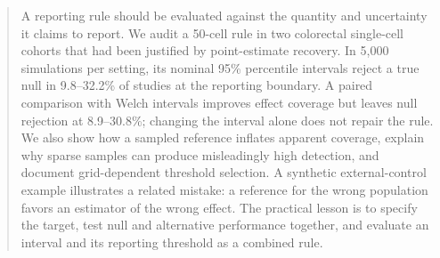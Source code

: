 \begin{abstract}
A reporting rule should be evaluated against the quantity and uncertainty it
claims to report. We audit a 50-cell rule in two colorectal single-cell cohorts
that had been justified by point-estimate recovery. In 5{,}000 simulations per
setting, its nominal 95\% percentile intervals reject a true null in
9.8--32.2\% of studies at the reporting boundary. A paired comparison with
Welch intervals improves effect coverage but leaves null rejection at
8.9--30.8\%; changing the interval alone does not repair the rule. We also
show how a sampled reference inflates apparent coverage, explain why sparse
samples can produce misleadingly high detection, and document grid-dependent
threshold selection. A synthetic external-control example illustrates a
related mistake: a reference for the wrong population favors an estimator
of the wrong effect. The practical lesson is to specify the target, test
null and alternative performance together, and evaluate an interval and its
reporting threshold as a combined rule.
\end{abstract}
